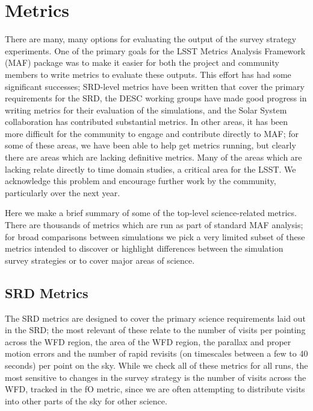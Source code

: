 \section{Metrics}

There are many, many options for evaluating the output of the survey strategy experiments. One of the primary goals for the LSST Metrics Analysis Framework (MAF) package was to make it easier for both the project and community members to write metrics to evaluate these outputs. This effort has had some significant successes; SRD-level metrics have been written that cover the primary requirements for the SRD, the DESC working groups have made good progress in writing metrics for their evaluation of the simulations, and the Solar System collaboration has contributed substantial metrics. In other areas, it has been more difficult for the community to engage and contribute directly to MAF; for some of these areas, we have been able to help get metrics running, but clearly there are areas which are lacking definitive metrics. Many of the areas which are lacking relate directly to time domain studies, a critical area for the LSST. We acknowledge this problem and encourage further work by the community, particularly over the next year. 

Here we make a brief summary of some of the top-level science-related metrics. There are thousands of metrics which are run as part of standard MAF analysis; for broad comparisons between simulations we pick a very limited subset of these metrics intended to discover or highlight differences between the simulation survey strategies or to cover major areas of science. 

\subsection{SRD Metrics}

The SRD metrics are designed to cover the primary science requirements laid out in the SRD; the most relevant of these relate to the number of visits per pointing across the WFD region, the area of the WFD region, the parallax and proper motion errors and the number of rapid revisits (on timescales between a few to 40 seconds) per point on the sky. While we check all of these metrics for all runs, the most sensitive to changes in the survey strategy is the number of visits across the WFD, tracked in the fO metric, since we are often attempting to distribute visits into other parts of the sky for other science. 

